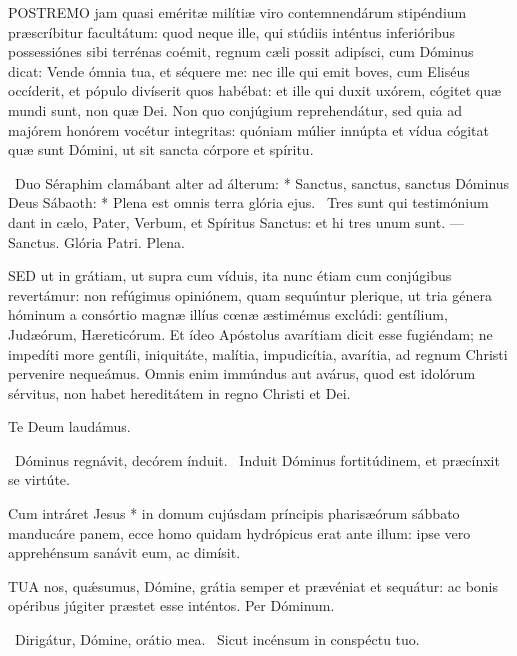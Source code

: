 

\lettrine[lines=2]{P}{OSTREMO} jam quasi eméritæ milítiæ viro contemnendárum stipéndium præscríbitur facultátum: quod neque ille, qui stúdiis inténtus inferióribus possessiónes sibi terrénas coémit, regnum cæli possit adipísci, cum Dóminus dicat: Vende ómnia tua, et séquere me: nec ille qui emit boves, cum Eliséus occíderit, et pópulo divíserit quos habébat: et ille qui duxit uxórem, cógitet quæ mundi sunt, non quæ Dei. Non quo conjúgium reprehendátur, sed quia ad majórem honórem vocétur integritas: quóniam múlier innúpta et vídua cógitat quæ sunt Dómini, ut sit sancta córpore et spíritu.

\R\ Duo Séraphim clamábant alter ad álterum: * Sanctus, sanctus, sanctus Dóminus Deus Sábaoth: * Plena est omnis terra glória ejus. \V\ Tres sunt qui testimónium dant in cælo, Pater, Verbum, et Spíritus Sanctus: et hi tres unum sunt. — Sanctus. Glória Patri. Plena.


\lettrine[lines=2]{S}{ED} ut in grátiam, ut supra cum víduis, ita nunc étiam cum conjúgibus revertámur: non refúgimus opiniónem, quam sequúntur plerique, ut tria génera hóminum a consórtio magnæ illíus cœnæ æstimémus exclúdi: gentílium, Judæórum, Hæreticórum. Et ídeo Apóstolus avarítiam dicit esse fugiéndam; ne impedíti more gentíli, iniquitáte, malítia, impudicítia, avarítia, ad regnum Christi pervenire nequeámus. Omnis enim immúndus aut avárus, quod est idolórum sérvitus, non habet hereditátem in regno Christi et Dei.

Te Deum laudámus.


\V\ Dóminus regnávit, decórem índuit. \R\ Induit Dóminus fortitúdinem, et præcínxit se virtúte.

 Cum intráret Jesus * in domum cujúsdam príncipis pharisæórum sábbato manducáre panem, ecce homo quidam hydrópicus erat ante illum: ipse vero apprehénsum sanávit eum, ac dimísit.


\lettrine[lines=2]{T}{UA} nos, quǽsumus, Dómine, grátia semper et prævéniat et sequátur: ac bonis opéribus júgiter præstet esse inténtos. Per Dóminum.


\V\ Dirigátur, Dómine, orátio mea. \R\ Sicut incénsum in conspéctu tuo.

